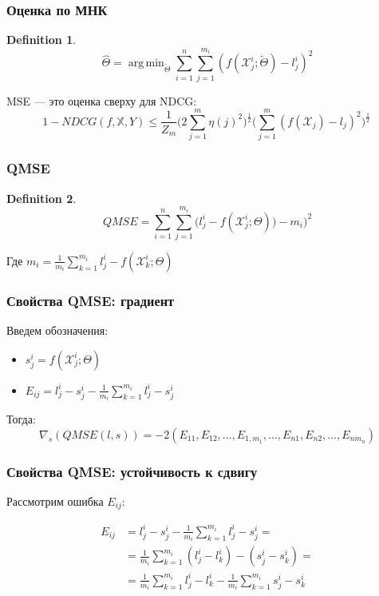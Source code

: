 \documentclass[unicode, notheorems]{beamer}
\DeclareMathOperator*{\argmin}{arg\,min}
\newtheorem{definition}{Definition}
\begin{document}
\begin{frame}
\frametitle{Оценка по МНК}

\begin{definition}
\begin{equation*}
\hat\Theta = \argmin_{\tilde\Theta}{\sum_{i=1}^n{\sum_{j=1}^{m_i}{(f(\mathcal X^i_j; \tilde\Theta) - l^i_j) ^ 2}}}
\end{equation*}
\end{definition}

MSE --- это оценка сверху для NDCG:
\begin{equation*}
1 - NDCG(f, \mathbb X, Y) \leq \frac{1}{Z_m}\Big( 2 \sum_{j=1}^{m}{\eta(j)^2}\Big)^{\frac{1}{2}} \Big( \sum_{j=1}^{m}{(f(\mathcal X_j) - l_j)^2}\Big)^{\frac{1}{2}}\,
\end{equation*}

\end{frame}

\begin{frame}
\frametitle{QMSE}

\begin{definition}
\begin{equation*}
QMSE = \sum_{i=1}^{n}{\sum_{j=1}^{m_i}{\big(  l^i_j - f(\mathcal X^i_j; \Theta)) - m_i \big)^2}}
\end{equation*}
\end{definition}
Где $m_i = \frac{1}{m_i}\sum_{k=1}^{m_i}{l^i_j - f(\mathcal X^i_k; \Theta)}$

\end{frame}

\begin{frame}
\frametitle{Свойства QMSE: градиент}

Введем обозначения:
\begin{itemize}
\item $s^i_j  = f(\mathcal X^i_j; \Theta)$ 
\item $E_{ij} = l^i_j - s^i_j -  \frac{1}{m_i}\sum_{k=1}^{m_i}{l^i_j - s^i_j}$
\end{itemize}

Тогда:
\begin{equation*}
\nabla_s (QMSE(l, s)) = -2 (E_{11}, E_{12}, \ldots, E_{1,m_1}, \ldots, E_{n1}, E_{n2}, \ldots, E_{nm_n})
\end{equation*}

\end{frame}

\begin{frame}
\frametitle{Свойства QMSE: устойчивость к сдвигу}
Рассмотрим ошибка $E_{ij}$:

\begin{equation*}
\begin{split}
E_{ij} & =  l^i_j - s^i_j -  \frac{1}{m_i}\sum_{k=1}^{m_i}{l^i_j - s^i_j} = \\ & = \frac{1}{m_i}\sum_{k=1}^{m_i}{(l^i_j - l^i_k) - (s^i_j - s^i_k)} = \\ & = \frac{1}{m_i}\sum_{k=1}^{m_i}{l^i_j - l^i_k} - \frac{1}{m_i}\sum_{k=1}^{m_i}{s^i_j - s^i_k}
\end{split}
\end{equation*}

\end{frame}
\end{document}
